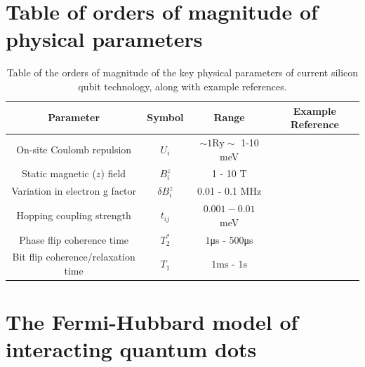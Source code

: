 \documentclass{report}
\begin{document}
\begin{appendices}\label{appendix:parameters}
\chapter{Table of orders of magnitude of physical parameters}
\begin{table}[ht]
    \centering
\begin{tabular}{|c|c|c|c|}
    \hline
    Parameter & Symbol & Range & Example Reference\\
    \hline
    On-site Coulomb repulsion & $U_i$ & $\sim 1\mathrm{Ry} \sim$ 1-10 \unit{\milli\electronvolt} & \cite{Shim2022}\\
    \hline 
    Static magnetic ($z$) field & $B_i^z$ & 1 - 10 \unit{\tesla} & \cite{Jock2018} \\
    \hline
    Variation in electron g factor & $\delta B_i^z$ &0.01 - 0.1 \unit{\mega\hertz} &\cite{Hwang2017} \\
    \hline
    Hopping coupling strength & $t_{ij}$ &$0.001 - 0.01$ \unit{\milli\electronvolt} & \cite{Veldhorst2015} \\
    \hline
    Phase flip coherence time &$ T_2^*$ &$1$\unit{\micro\second} - $500$\unit{\micro\second}& \cite{Loss2022}\\
    \hline
    Bit flip coherence/relaxation time &$T_1$&$1\unit{\milli\second}$ - $1\unit{\second}$& \cite{Xue2020}\\
    \hline

\end{tabular}
\caption{Table of the orders of magnitude of the key physical parameters of current silicon qubit technology, along with example references.}\label{table:parameters}
\end{table}
\chapter{The Fermi-Hubbard model of interacting quantum dots}\label{appendix:hubbard}


\end{appendices}
\end{document}
